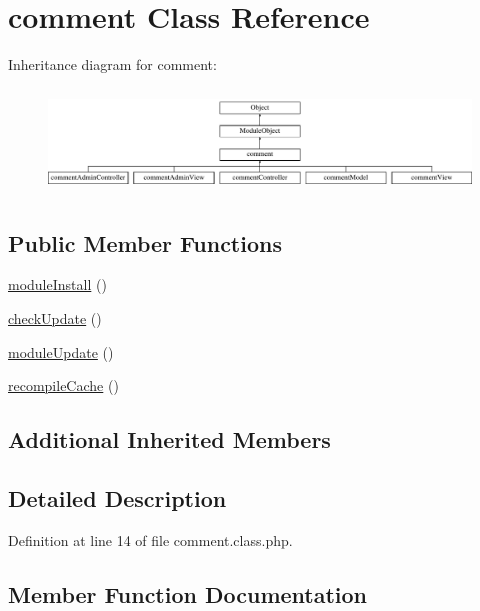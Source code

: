 \hypertarget{classcomment}{}\section{comment Class Reference}
\label{classcomment}
Inheritance diagram for comment\+:\begin{figure}[H]
\begin{center}
\leavevmode
\includegraphics[height=2.800000cm]{classcomment}
\end{center}
\end{figure}
\subsection*{Public Member Functions}
\begin{DoxyCompactItemize}
\item 
\hyperlink{classcomment_a635989397982dcf8a45c9a374bf11aec}{module\+Install} ()
\item 
\hyperlink{classcomment_a6ccae5215742b254afa1c06d1bc2d7d3}{check\+Update} ()
\item 
\hyperlink{classcomment_abcf41a36b46e090d498f35a0df92edc0}{module\+Update} ()
\item 
\hyperlink{classcomment_a904e04f286e217d550f26a38139107aa}{recompile\+Cache} ()
\end{DoxyCompactItemize}
\subsection*{Additional Inherited Members}


\subsection{Detailed Description}


Definition at line 14 of file comment.\+class.\+php.



\subsection{Member Function Documentation}
\mbox{\label{classcomment_a6ccae5215742b254afa1c06d1bc2d7d3}} 
